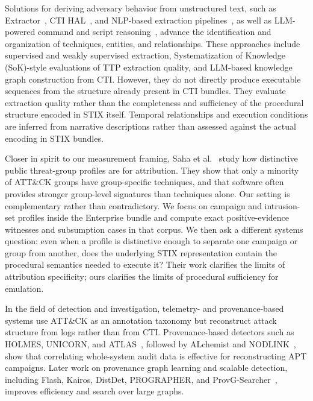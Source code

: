 \documentclass[sigconf]{acmart}
\newcommand{\stix}{STIX\xspace}
\newcommand{\attack}{ATT\&CK\xspace}
\begin{document}
Solutions for deriving adversary behavior from unstructured text, such as Extractor~\cite{savat2021extractor}, CTI HAL~\cite{dellapenna2025ctihal}, and NLP-based extraction pipelines~\cite{gabrys2024nlp,marvin2025sokttp,xu2024intelex,cheng2025ctinexus}, as well as LLM-powered command and script reasoning~\cite{deng2024raconteur}, advance the identification and organization of techniques, entities, and relationships. These approaches include supervised and weakly supervised extraction, Systematization of Knowledge (SoK)-style evaluations of TTP extraction quality, and LLM-based knowledge graph construction from CTI. However, they do not directly produce executable sequences from the structure already present in CTI bundles. They evaluate extraction quality rather than the completeness and sufficiency of the procedural structure encoded in \stix{} itself. Temporal relationships and execution conditions are inferred from narrative descriptions rather than assessed against the actual encoding in \stix{} bundles.

Closer in spirit to our measurement framing, Saha et al.~\cite{saha2026kitten} study how distinctive public threat-group profiles are for attribution. They show that only a minority of \attack{} groups have group-specific techniques, and that software often provides stronger group-level signatures than techniques alone. Our setting is complementary rather than contradictory. We focus on campaign and intrusion-set profiles inside the Enterprise bundle and compute exact positive-evidence witnesses and subsumption cases in that corpus. We then ask a different systems question: even when a profile is distinctive enough to separate one campaign or group from another, does the underlying \stix{} representation contain the procedural semantics needed to execute it? Their work clarifies the limits of attribution specificity; ours clarifies the limits of procedural sufficiency for emulation.

In the field of detection and investigation, telemetry- and provenance-based systems use \attack{} as an annotation taxonomy but reconstruct attack structure from logs rather than from CTI. Provenance-based detectors such as HOLMES, UNICORN, and ATLAS~\cite{milajerdi2019holmes,han2020unicorn,abdulellah2021atlas}, followed by ALchemist and NODLINK~\cite{yu2021alchemist,li2024nodlink}, show that correlating whole-system audit data is effective for reconstructing APT campaigns. Later work on provenance graph learning and scalable detection, including Flash, Kairos, DistDet, PROGRAPHER, and ProvG-Searcher~\cite{10646725,10646673,feng2023distdet,fanyang2023prographer,altinisik2023provg}, improves efficiency and search over large graphs.
\end{document}
